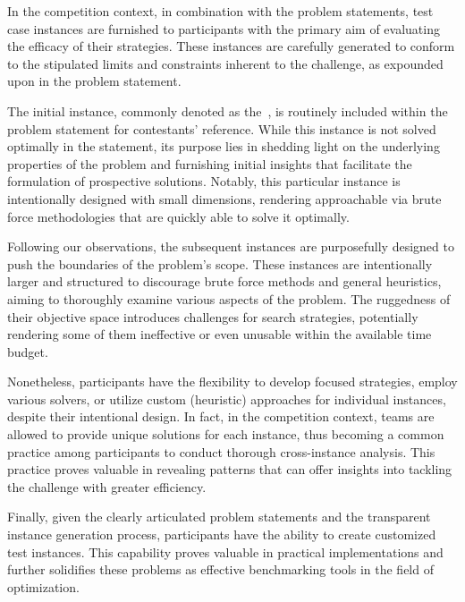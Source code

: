 In the competition context, in combination with the problem statements, test
case instances are furnished to participants with the primary aim of evaluating
the efficacy of their strategies. These instances are carefully generated to
conform to the stipulated limits and constraints inherent to the challenge, as
expounded upon in the problem statement.

The initial instance, commonly denoted as the~, is routinely
included within the problem statement for contestants' reference. While this
instance is not solved optimally in the statement, its purpose lies in shedding
light on the underlying properties of the problem and furnishing initial
insights that facilitate the formulation of prospective solutions. Notably, this
particular instance is intentionally designed with small dimensions, rendering
approachable via brute force methodologies that are quickly able to solve it
optimally.

Following our observations, the subsequent instances are purposefully designed
to push the boundaries of the problem's scope. These instances are intentionally
larger and structured to discourage brute force methods and general heuristics,
aiming to thoroughly examine various aspects of the problem. The ruggedness of
their objective space introduces challenges for search strategies, potentially
rendering some of them ineffective or even unusable within the available time
budget.

Nonetheless, participants have the flexibility to develop focused strategies,
employ various solvers, or utilize custom (heuristic) approaches for individual
instances, despite their intentional design. In fact, in the competition
context, teams are allowed to provide unique solutions for each instance, thus
becoming a common practice among participants to conduct thorough cross-instance
analysis. This practice proves valuable in revealing patterns that can
offer insights into tackling the challenge with greater efficiency.

Finally, given the clearly articulated problem statements and the transparent
instance generation process, participants have the ability to create customized
test instances. This capability proves valuable in practical implementations and
further solidifies these problems as effective benchmarking tools in the field
of optimization.